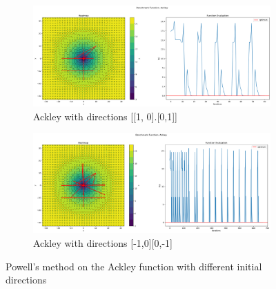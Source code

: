 \begin{figure}[H]
    \begin{subfigure}{0.5\textwidth}
        \includegraphics[width=\textwidth]{lab1/imgs/pw_ackley.png}
        \caption{Ackley with directions [[1, 0].[0,1]]}
    \end{subfigure}
    \begin{subfigure}{0.5\textwidth}
        \includegraphics[width=\textwidth]{lab1/imgs/pw_ackley_opposite.png}
        \caption{Ackley with directions [-1,0][0,-1]}
    \end{subfigure}
    \caption{Powell's method on the Ackley function with different initial directions}
    \label{fig:ackley}
\end{figure}

